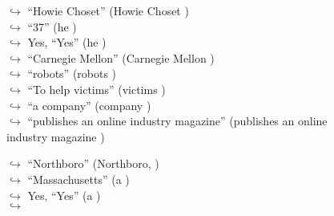 \documentclass[11pt,a4paper, onecolumn]{article}
\begin{document}
\begin{figure}[t] \small \begin{tcolorbox}[boxsep=0pt,left=5pt,right=0pt,top=2pt,colback = yellow!5] \begin{dialogue}
 \small 
\colorbox{pink!25}{$\hookrightarrow$}
{ ``Howie Choset'' (Howie Choset ) }
\\
\colorbox{pink!25}{$\hookrightarrow$}
{ ``37'' (he ) }
\\
\colorbox{pink!25}{$\hookrightarrow$}
\colorbox{red!25}{Yes,}
{ ``Yes'' (he ) }
\\
\colorbox{pink!25}{$\hookrightarrow$}
{ ``Carnegie Mellon'' (Carnegie Mellon ) }
\\
\colorbox{pink!25}{$\hookrightarrow$}
{ ``robots'' (robots ) }
\\
\colorbox{pink!25}{$\hookrightarrow$}
{ ``To help victims'' (victims ) }
\\
\colorbox{pink!25}{$\hookrightarrow$}
{ ``a company'' (company ) }
\\
\colorbox{pink!25}{$\hookrightarrow$}
{ ``publishes an online industry magazine'' (publishes an online industry magazine ) }
 \end{dialogue}\end{tcolorbox}\end{figure}\begin{figure}[t] \small \begin{tcolorbox}[boxsep=0pt,left=5pt,right=0pt,top=2pt,colback = yellow!5] \begin{dialogue}
 \small 
\colorbox{pink!25}{$\hookrightarrow$}
{ ``Northboro'' (Northboro, ) }
\\
\colorbox{pink!25}{$\hookrightarrow$}
{ ``Massachusetts'' (a ) }
\\
\colorbox{pink!25}{$\hookrightarrow$}
\colorbox{red!25}{Yes,}
{ ``Yes'' (a ) }
\\
\colorbox{pink!25}{$\hookrightarrow$}

\end{dialogue}
\end{tcolorbox}
\end{figure}
\end{document}
